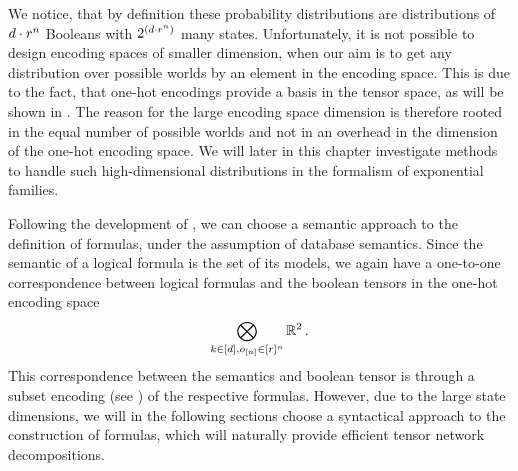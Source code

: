We notice, that by definition these probability distributions are distributions of $d\cdot r^{n}$ Booleans with $2^{\left(d\cdot r^{n}\right)}$ many states.
Unfortunately, it is not possible to design encoding spaces of smaller dimension, when our aim is to get any distribution over possible worlds by an element in the encoding space.
This is due to the fact, that one-hot encodings provide a basis in the tensor space, as will be shown in .
The reason for the large encoding space dimension is therefore rooted in the equal number of possible worlds and not in an overhead in the dimension of the one-hot encoding space.
We will later in this chapter investigate methods to handle such high-dimensional distributions in the formalism of exponential families.


Following the development of , we can choose a semantic approach to the definition of formulas, under the assumption of database semantics.
Since the semantic of a logical formula is the set of its models, we again have a one-to-one correspondence between logical formulas and the boolean tensors in the one-hot encoding space
\begin{align*}
    \bigotimes_{k\in[d],o_{[n]}\in[r]^{n}} \mathbb{R}^2 \, .
\end{align*}
This correspondence between the semantics and boolean tensor is through a subset encoding (see ) of the respective formulas.
However, due to the large state dimensions, we will in the following sections choose a syntactical approach to the construction of formulas, which will naturally provide efficient tensor network decompositions.


